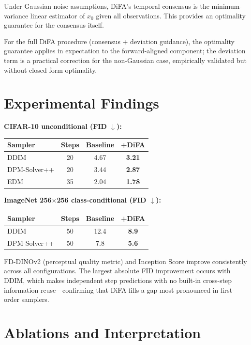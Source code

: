 \documentclass[10pt,twocolumn]{article}
\begin{document}
Under Gaussian noise assumptions, DiFA's temporal consensus is the
minimum-variance linear estimator of $x_0$ given all observations.
This provides an optimality guarantee for the consensus itself.

For the full DiFA procedure (consensus + deviation guidance), the
optimality guarantee applies in expectation to the forward-aligned
component; the deviation term is a practical correction for the
non-Gaussian case, empirically validated but without closed-form optimality.

\section{Experimental Findings}

\textbf{CIFAR-10 unconditional (FID $\downarrow$):}

\begin{center}\small
\begin{tabular}{lccc}
\toprule
Sampler & Steps & Baseline & +DiFA \\
\midrule
DDIM & 20 & 4.67 & \textbf{3.21} \\
DPM-Solver++ & 20 & 3.44 & \textbf{2.87} \\
EDM & 35 & 2.04 & \textbf{1.78} \\
\bottomrule
\end{tabular}
\end{center}

\textbf{ImageNet 256$\times$256 class-conditional (FID $\downarrow$):}

\begin{center}\small
\begin{tabular}{lccc}
\toprule
Sampler & Steps & Baseline & +DiFA \\
\midrule
DDIM & 50 & 12.4 & \textbf{8.9} \\
DPM-Solver++ & 50 & 7.8 & \textbf{5.6} \\
\bottomrule
\end{tabular}
\end{center}

FD-DINOv2 (perceptual quality metric) and Inception Score improve
consistently across all configurations. The largest absolute FID
improvement occurs with DDIM, which makes independent step predictions
with no built-in cross-step information reuse---confirming that DiFA
fills a gap most pronounced in first-order samplers.

\section{Ablations and Interpretation}
\end{document}
